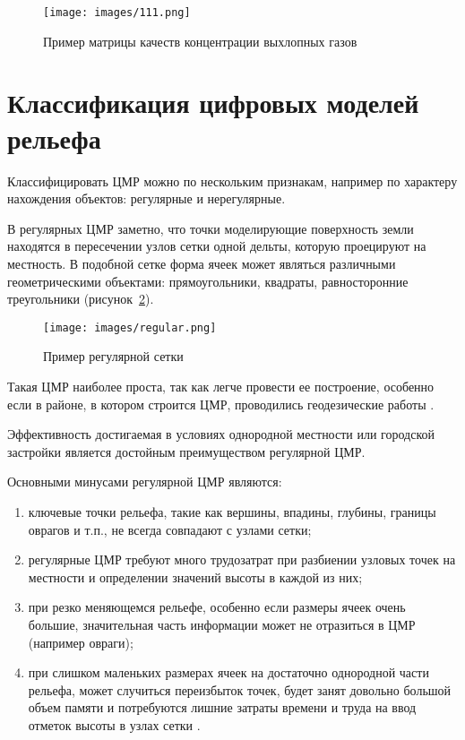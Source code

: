 \begin{figure}[h!]
    \center
    \texttt{[image: images/111.png]}
    \caption{Пример матрицы качеств концентрации выхлопных газов}
    \label{fig:2}
\end{figure}

\section{Классификация цифровых моделей рельефа}
Классифицировать ЦМР можно по нескольким признакам, например по характеру нахождения объектов: регулярные и нерегулярные.

В регулярных ЦМР заметно, что точки моделирующие поверхность земли находятся в пересечении узлов сетки одной дельты, которую проецируют на местность. В подобной сетке форма ячеек может являться различными геометрическими объектами: прямоугольники, квадраты, равносторонние треугольники (рисунок~\ref{fig:3}).

\begin{figure}[h!]
    \center
    \texttt{[image: images/regular.png]}
    \caption{Пример регулярной сетки}
    \label{fig:3}
\end{figure}

Такая ЦМР наиболее проста, так как легче провести ее построение, особенно если в районе, в котором строится ЦМР, проводились геодезические работы \cite{9,20}. 

Эффективность достигаемая в условиях однородной местности или городской застройки является достойным преимуществом регулярной ЦМР.

Основными минусами регулярной ЦМР являются:  

\begin{enumerate} 
  \item[1)] ключевые точки рельефа, такие как вершины, впадины, глубины, границы оврагов и т.п., не всегда  совпадают с узлами сетки;
  \item[2)] регулярные ЦМР требуют много трудозатрат при разбиении узловых точек на местности и определении значений высоты в каждой из них;
  \item[3)] при резко меняющемся рельефе, особенно если размеры ячеек очень большие, значительная часть информации может не отразиться в ЦМР (например овраги);
  \item[4)] при слишком маленьких размерах ячеек на достаточно однородной части рельефа, может случиться переизбыток точек, будет занят довольно большой объем памяти и потребуются лишние затраты времени и труда на ввод отметок высоты в узлах сетки \cite{19,22}.
\end{enumerate} 


